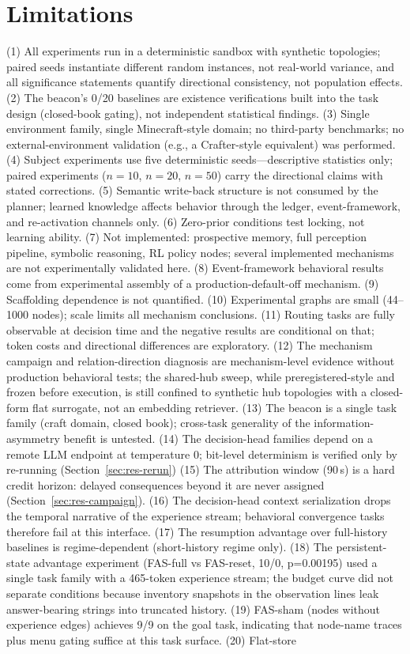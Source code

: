 \documentclass[10pt,a4paper]{article}
\begin{document}
\section{Limitations}
\label{sec:limits}
(1) All experiments run in a deterministic sandbox with synthetic topologies; paired seeds instantiate different random instances, not real-world variance, and all significance statements quantify directional consistency, not population effects. (2) The beacon's 0/20 baselines are existence verifications built into the task design (closed-book gating), not independent statistical findings. (3) Single environment family, single Minecraft-style domain; no third-party benchmarks; no external-environment validation (e.g., a Crafter-style equivalent) was performed. (4) Subject experiments use five deterministic seeds---descriptive statistics only; paired experiments ($n{=}10$, $n{=}20$, $n{=}50$) carry the directional claims with stated corrections. (5) Semantic write-back structure is not consumed by the planner; learned knowledge affects behavior through the ledger, event-framework, and re-activation channels only. (6) Zero-prior conditions test locking, not learning ability. (7) Not implemented: prospective memory, full perception pipeline, symbolic reasoning, RL policy nodes; several implemented mechanisms are not experimentally validated here. (8) Event-framework behavioral results come from experimental assembly of a production-default-off mechanism. (9) Scaffolding dependence is not quantified. (10) Experimental graphs are small (44--1000 nodes); scale limits all mechanism conclusions. (11) Routing tasks are fully observable at decision time and the negative results are conditional on that; token costs and directional differences are exploratory. (12) The mechanism campaign and relation-direction diagnosis are mechanism-level evidence without production behavioral tests; the shared-hub sweep, while preregistered-style and frozen before execution, is still confined to synthetic hub topologies with a closed-form flat surrogate, not an embedding retriever. (13) The beacon is a single task family (craft domain, closed book); cross-task generality of the information-asymmetry benefit is untested. (14) The decision-head families depend on a remote LLM endpoint at temperature 0; bit-level determinism is verified only by re-running (Section~\ref{sec:res-rerun}) (15) The attribution window (90\,s) is a hard credit horizon: delayed consequences beyond it are never assigned (Section~\ref{sec:res-campaign}). (16) The decision-head context serialization drops the temporal narrative of the experience stream; behavioral convergence tasks therefore fail at this interface. (17) The resumption advantage over full-history baselines is regime-dependent (short-history regime only). (18) The persistent-state advantage experiment (FAS-full vs FAS-reset, 10/0, p=0.00195) used a single task family with a 465-token experience stream; the budget curve did not separate conditions because inventory snapshots in the observation lines leak answer-bearing strings into truncated history. (19) FAS-sham (nodes without experience edges) achieves 9/9 on the goal task, indicating that node-name traces plus menu gating suffice at this task surface. (20) Flat-store 
\end{document}
